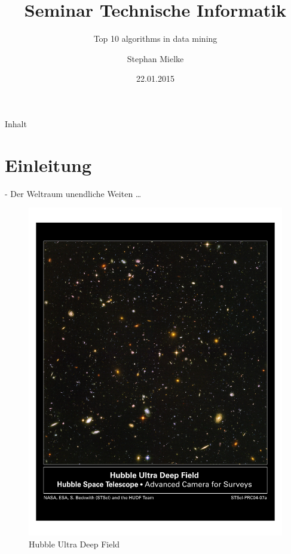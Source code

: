 \documentclass[fleqn,11pt,aspectratio=43]{beamer}
\title{Seminar Technische Informatik}
\subtitle{Top 10 algorithms in data mining}
\author{Stephan Mielke}
\date{22.01.2015}
\begin{document}
\begin{frame}
\titlepage
\end{frame}

\begin{frame}{Inhalt}
\tableofcontents
\end{frame}

\section*{Einleitung~}

\begin{frame}[plain]{\insertsectionhead - Der Weltraum unendliche Weiten \dots}

\begin{figure}
\includegraphics[scale=0.6,trim={40 400 40 80},clip]{hs-2004-07-a-pdf}
\caption{Hubble Ultra Deep Field\cite{HUDF}}
\label{fig:hs-2004-07-a-pdf}
\end{figure}
\end{frame}
\end{document}

